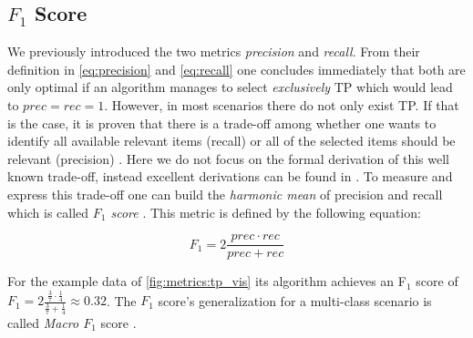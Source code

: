 \subsection{$F_1$ Score}
\label{chp:fundamentals:sec:metrics:subsec:f1_score}

We previously introduced the two metrics \textit{precision} and \textit{recall}.
From their definition in \cref{eq:precision} and \cref{eq:recall} one concludes immediately that both are only optimal if an algorithm manages to select \textit{exclusively} \ac{TP} which would lead to $prec = rec = 1$.
However, in most scenarios there do not only exist \ac{TP}.
If that is the case, it is proven that there is a trade-off among whether one wants to identify all available relevant items (recall) or all of the selected items should be relevant (precision) \parencite{Gordon:1989}.
Here we do not focus on the formal derivation of this well known trade-off, instead excellent derivations can be found in \textcites{Gordon:1989}{Zhu:2004}.
To measure and express this trade-off one can build the \textit{harmonic mean} of precision and recall which is called \textit{$F_1$ score} \parencite{Powers:2011}.
This metric is defined by the following equation:

\begin{equation}\label{eq:f1_score}
    F_1 = 2 \frac{prec \cdot rec}{prec+rec}
\end{equation}

For the example data of \cref{fig:metrics:tp_vis} its algorithm achieves an F$_1$ score of $F_1 = 2 \frac{\frac{3}{7} \cdot \frac{1}{4}}{\frac{3}{7}+\frac{1}{4}} \approx 0.32$.
The $F_1$ score's generalization for a multi-class scenario is called \textit{Macro $F_1$} score \parencite{Opitz:2019}.

